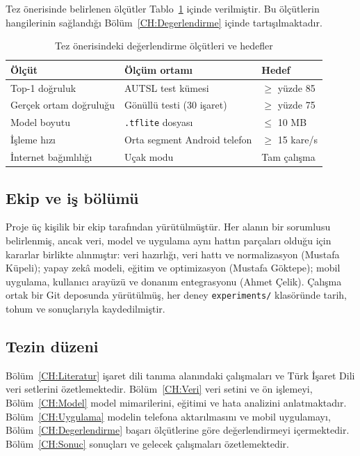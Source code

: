 Tez önerisinde belirlenen ölçütler Tablo~\ref{tab:olcutler} içinde verilmiştir. Bu
ölçütlerin hangilerinin sağlandığı Bölüm~\ref{CH:Degerlendirme} içinde
tartışılmaktadır.

\begin{table}[H]
\centering
\caption{Tez önerisindeki değerlendirme ölçütleri ve hedefler}
\label{tab:olcutler}
\begin{tabular}{@{}lll@{}}
\toprule
\textbf{Ölçüt} & \textbf{Ölçüm ortamı} & \textbf{Hedef} \\
\midrule
Top-1 doğruluk & AUTSL test kümesi & $\geq$ yüzde 85 \\
Gerçek ortam doğruluğu & Gönüllü testi (30 işaret) & $\geq$ yüzde 75 \\
Model boyutu & \texttt{.tflite} dosyası & $\leq$ 10 MB \\
İşleme hızı & Orta segment Android telefon & $\geq$ 15 kare/s \\
İnternet bağımlılığı & Uçak modu & Tam çalışma \\
\bottomrule
\end{tabular}
\end{table}

\subsection{Ekip ve iş bölümü}

Proje üç kişilik bir ekip tarafından yürütülmüştür. Her alanın bir sorumlusu
belirlenmiş, ancak veri, model ve uygulama aynı hattın parçaları olduğu için kararlar
birlikte alınmıştır: veri hazırlığı, veri hattı ve normalizasyon (Mustafa Küpeli);
yapay zekâ modeli, eğitim ve optimizasyon (Mustafa Göktepe); mobil uygulama, kullanıcı
arayüzü ve donanım entegrasyonu (Ahmet Çelik). Çalışma ortak bir Git deposunda
yürütülmüş, her deney \texttt{experiments/} klasöründe tarih, tohum ve sonuçlarıyla
kaydedilmiştir.

\subsection{Tezin düzeni}

Bölüm~\ref{CH:Literatur} işaret dili tanıma alanındaki çalışmaları ve Türk İşaret Dili
veri setlerini özetlemektedir. Bölüm~\ref{CH:Veri} veri setini ve ön işlemeyi,
Bölüm~\ref{CH:Model} model mimarilerini, eğitimi ve hata analizini anlatmaktadır.
Bölüm~\ref{CH:Uygulama} modelin telefona aktarılmasını ve mobil uygulamayı,
Bölüm~\ref{CH:Degerlendirme} başarı ölçütlerine göre değerlendirmeyi içermektedir.
Bölüm~\ref{CH:Sonuc} sonuçları ve gelecek çalışmaları özetlemektedir.
